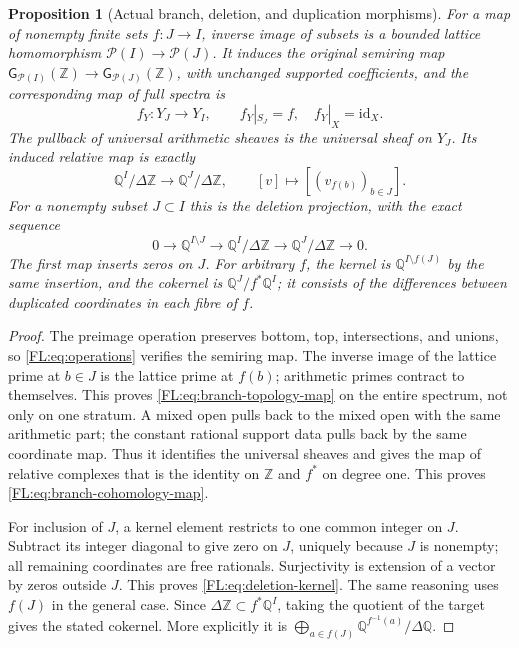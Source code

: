 \documentclass[11pt,a4paper]{article}
\newtheorem{proposition}[theorem]{Proposition}
\theoremstyle{definition}\newtheorem{definition}[theorem]{Definition}
\newcommand{\G}{\mathsf G}\newcommand{\Tor}{\operatorname{Tor}}\newcommand{\Frac}{\operatorname{Frac}}
\providecommand{\RQ}{\mathbb Q}
\begin{document}
\begin{proposition}[Actual branch, deletion, and duplication morphisms]
\label{FL:prop:deletions}
For a map of nonempty finite sets $f:J\to I$, inverse image of subsets
is a bounded lattice homomorphism $\mathcal P(I)\to\mathcal P(J)$.
It induces the original semiring map
$\G_{\mathcal P(I)}(\mathbb Z)\to\G_{\mathcal P(J)}(\mathbb Z)$,
with unchanged supported coefficients, and the corresponding map of
full spectra is
\[
 f_Y:Y_J\to Y_I,\qquad f_Y|_{S_J}=f,\quad f_Y|_X=\mathrm{id}_X.
 \tag{FL29}\label{FL:eq:branch-topology-map}
\]
The pullback of universal arithmetic sheaves is the universal sheaf
on $Y_J$. Its induced relative map is exactly
\[
 \RQ^I/\Delta\mathbb Z\longrightarrow\RQ^J/\Delta\mathbb Z,
 \qquad [v]\longmapsto[(v_{f(b)})_{b\in J}].
 \tag{FL30}\label{FL:eq:branch-cohomology-map}
\]
For a nonempty subset $J\subset I$ this is the deletion projection,
with the exact sequence
\[
 0\longrightarrow\RQ^{I\setminus J}
 \longrightarrow\RQ^I/\Delta\mathbb Z
 \longrightarrow\RQ^J/\Delta\mathbb Z\longrightarrow0.
 \tag{FL31}\label{FL:eq:deletion-kernel}
\]
The first map inserts zeros on $J$. For arbitrary $f$, the kernel
is $\RQ^{I\setminus f(J)}$ by the same insertion, and the cokernel is
$\RQ^J/f^*\RQ^I$; it consists of the differences between duplicated
coordinates in each fibre of $f$.
\end{proposition}
\begin{proof}
The preimage operation preserves bottom, top, intersections, and
unions, so \eqref{FL:eq:operations} verifies the semiring map. The
inverse image of the lattice prime at $b\in J$ is the lattice prime
at $f(b)$; arithmetic primes contract to themselves. This proves
\eqref{FL:eq:branch-topology-map} on the entire spectrum, not only on
one stratum. A mixed open pulls back to the mixed open with the same
arithmetic part; the constant rational support data pulls back by
the same coordinate map. Thus it identifies the universal sheaves
and gives the map of relative complexes that is the identity on
$\mathbb Z$ and $f^*$ on degree one. This proves
\eqref{FL:eq:branch-cohomology-map}.

For inclusion of $J$, a kernel element restricts to one common integer
on $J$. Subtract its integer diagonal to give zero on $J$, uniquely
because $J$ is nonempty; all remaining coordinates are free rationals.
Surjectivity is extension of a vector by zeros outside $J$. This proves
\eqref{FL:eq:deletion-kernel}. The same reasoning uses $f(J)$ in the
general case. Since $\Delta\mathbb Z\subset f^*\RQ^I$, taking the
quotient of the target gives the stated cokernel. More explicitly it
is $\bigoplus_{a\in f(J)}\RQ^{f^{-1}(a)}/\Delta\RQ$.
\end{proof}
\end{document}
